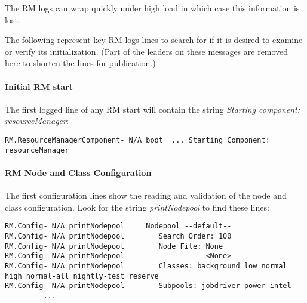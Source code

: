    The RM logs can wrap quickly under high load in which case this information is lost.

   The following represent key RM logs lines to search for if it is desired to examine or verify its
   initialization.  (Part of the leaders on these messages are removed here to shorten the
   lines for publication.)

    \paragraph{Initial RM start}
    The first logged line of any RM start will contain the string {\em Starting component:  resourceManager}:
\begin{verbatim}
RM.ResourceManagerComponent- N/A boot  ... Starting Component:  resourceManager
\end{verbatim}

    \paragraph{RM Node and Class Configuration}
    The first configuration lines show the reading and validation of the node and class configuration.  Look
    for the string {\em printNodepool} to find these lines:
\begin{verbatim}
RM.Config- N/A printNodepool     Nodepool --default--
RM.Config- N/A printNodepool        Search Order: 100
RM.Config- N/A printNodepool        Node File: None
RM.Config- N/A printNodepool                   <None>
RM.Config- N/A printNodepool        Classes: background low normal high normal-all nightly-test reserve
RM.Config- N/A printNodepool        Subpools: jobdriver power intel
         ...
\end{verbatim}

